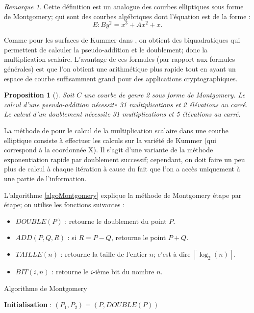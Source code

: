 \documentclass[a4paper]{article}
\newtheorem{proposition}[theoreme]{Proposition}
\theoremstyle{definition}
\theoremstyle{remark}
\newtheorem{remarque}{Remarque}
\numberwithin{equation}{section}
\begin{document}
\begin{remarque}
Cette définition est un analogue des courbes elliptiques sous forme de Montgomery; qui sont des courbes algébriques dont l'équation est de la forme :
$$E : By^2 = x^3 + Ax^2 + x.$$
\end{remarque}

Comme pour les surfaces de Kummer dans \citep{cassels-Flynn}, on obtient des biquadratiques qui permettent de calculer la pseudo-addition et le doublement; donc la multiplication scalaire. L'avantage de ces formules (par rapport aux formules générales) est que l'on obtient une arithmétique plus rapide tout en ayant un espace de courbe suffisamment grand pour des applications cryptographiques.

\begin{proposition}[\citet{duquesne}]
\label{propDuquesne}
Soit $C$ une courbe de genre 2 sous forme de Montgomery. Le calcul d'une pseudo-addition nécessite 31 multiplications et 2 élévations au carré. Le calcul d'un doublement nécessite 31 multiplications et 5 élévations au carré.
\end{proposition}

La méthode de \citet{montgomery} pour le calcul de la multiplication scalaire dans une courbe elliptique consiste à effectuer les calculs sur la variété de Kummer (qui correspond à la coordonnée X). Il s'agit d'une variante de la méthode exponentiation rapide par doublement successif; cependant, on doit faire un peu plus de calcul à chaque itération à cause du fait que l'on a accès uniquement à une partie de l'information.

L'algorithme \ref{algoMontgomery} explique la méthode de Montgomery étape par étape; on utilise les fonctions suivantes :
\begin{itemize}
\item $DOUBLE(P)$ : retourne le doublement du point $P$.
\item $ADD(P,Q,R)$ : si $R = P-Q$, retourne le point $P+Q$.
\item $TAILLE(n)$ : retourne la taille de l'entier $n$; c'est à dire $\left \lceil{\log_2(n)}\right \rceil$.
\item $BIT(i,n)$ : retourne le $i$-ième bit du nombre $n$.
\end{itemize}

\begin{algorithm}
\label{algoMontgomery}
\caption{Algorithme de Montgomery}
\textbf{Initialisation} : $(P_1,P_2) = (P,DOUBLE(P))$
\BlankLine
{}
\end{algorithm}
\end{document}
